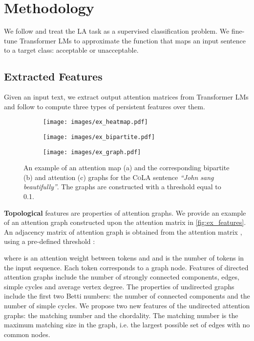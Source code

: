 \documentclass[11pt]{article}
\begin{document}
\section{Methodology}
We follow \citealp{warstadt-etal-2019-neural} and treat the LA task as a supervised classification problem.
We fine-tune Transformer LMs to approximate the function that maps an input sentence to a target class: acceptable or unacceptable. 
\subsection{Extracted Features}\label{sec:tda_method}
Given an input text, we extract output attention matrices from Transformer LMs and follow \citealp{kushnareva-etal-2021-artificial} to compute three types of persistent features over them.



\begin{figure*}[h!]
\centering
\begin{subfigure}{0.3\textwidth}
    \texttt{[image: images/ex\_heatmap.pdf]}
    \caption{}
    \label{fig:first}
\end{subfigure}
\hfill
\begin{subfigure}{0.3\textwidth}
    \texttt{[image: images/ex\_bipartite.pdf]}
    \caption{}
    \label{fig:second}
\end{subfigure}
\hfill
\begin{subfigure}{0.36\textwidth}
    \texttt{[image: images/ex\_graph.pdf]}
    \caption{}
    \label{fig:third}
\end{subfigure}

\caption{An example of an attention map (a) and the corresponding bipartite (b) and attention (c) graphs for the \textsc{CoLA} sentence \textit{``John sang beautifully''}.  The graphs are constructed with a threshold equal to 0.1.}
\label{fig:ex_features}
\end{figure*}







\textbf{Topological} features are properties of attention graphs.
We provide an example of an attention graph constructed upon the attention matrix in \autoref{fig:ex_features}.
An adjacency matrix of attention graph  is obtained from the attention matrix , using a pre-defined threshold : 

where  is an attention weight between tokens  and  and  is the number of tokens in the input sequence. Each token corresponds to a graph node.
Features of directed attention graphs include the number of strongly connected components, edges, simple cycles and average vertex degree. 
The properties of undirected graphs include the first two Betti numbers: the number of connected components and the number of simple cycles. 
We propose two new features of the undirected attention graphs: the matching number and the chordality. 
The matching number is the maximum matching size in the graph, i.e. the largest possible set of edges with no common nodes.
\end{document}
